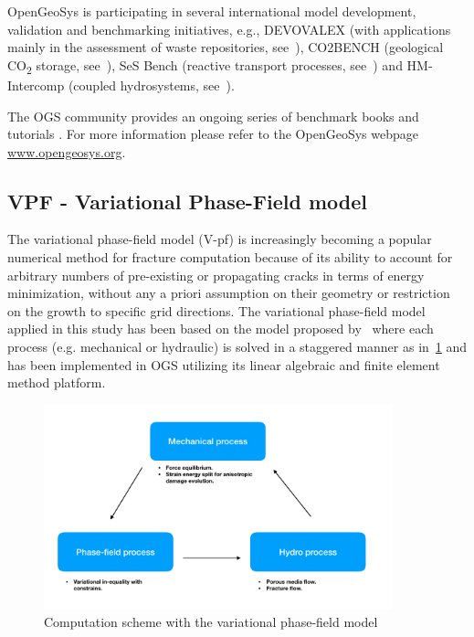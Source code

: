 OpenGeoSys is participating in several international model development, validation and benchmarking initiatives, e.g., DEVOVALEX (with applications mainly in the assessment of waste repositories, see~\cite{Birkholzer2018}), CO2BENCH (geological CO\textsubscript{2} storage, see~\cite{Kolditz2012613}), SeS Bench (reactive transport processes, see~\cite{Steefel:2015}) and HM-Intercomp (coupled hydrosystems, see~\cite{Maxwell:2015}).

The OGS community provides an ongoing series of benchmark books \cite{BB4} and tutorials \cite{Lehmann:2018}. For more information please refer to the OpenGeoSys webpage \url{www.opengeosys.org}.

\subsection*{VPF - Variational Phase-Field model}

The variational phase-field model (V-pf) is increasingly becoming a popular numerical method for fracture computation because of its ability to account for arbitrary numbers of pre-existing or propagating cracks in terms of energy minimization, without any a priori assumption on their geometry or restriction on the growth to specific grid directions.
The variational phase-field model applied in this study has been based on the model proposed by~\cite{Bourdin2012, Chukwudozie2019} where each process (e.g. mechanical or hydraulic) is solved in a staggered manner as in~\ref{fig:Keita_VPF_code} and has been implemented in OGS utilizing its linear algebraic and finite element method platform.

\begin{figure}[!ht]
\centering
\includegraphics[width=0.9\textwidth]{figures/VPF_code.png}
\caption{Computation scheme with the variational phase-field model}
\label{fig:Keita_VPF_code}
\end{figure} 

